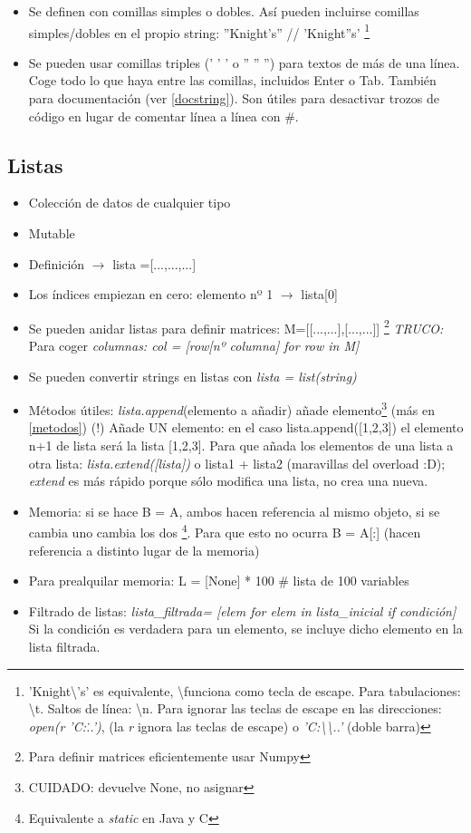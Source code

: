 		\begin{itemize}
		\item 	Se definen con comillas simples o dobles. Así pueden incluirse comillas simples/dobles en el propio string: ''Knight's'' // 'Knight''s' \footnote{'Knight\textbackslash's' es equivalente, \textbackslash funciona como tecla de escape. Para tabulaciones: \textbackslash t. Saltos de línea: \textbackslash n. Para ignorar las teclas de escape en las direcciones: \textit{open(r 'C:\...')}, (la \textit{r} ignora las teclas de escape) o \textit{'C:\textbackslash \textbackslash..'} (doble barra)}
		
		\item Se pueden usar comillas triples (' ' ' o '' '' '') para textos de más de una línea. Coge todo lo que haya entre las comillas, incluidos Enter o Tab. También para documentación (ver \ref{docstring}). Son útiles para desactivar trozos de código en lugar de comentar línea a línea con \#. 
		\end{itemize}

	\subsection {Listas}

	\begin{itemize}
	\item Colección de datos de cualquier tipo
	\item Mutable
	\item Definición $ \rightarrow $ lista =[...,...,...]
	\item Los índices empiezan en cero: elemento nº 1 $\rightarrow$ lista[0]
	\item Se pueden anidar listas para definir matrices: M=[[...,...],[...,...]] \footnote{Para definir matrices eficientemente usar Numpy} \textit{TRUCO:} Para coger \textit{columnas: col = [row[nº columna] for row in M]}
	\item Se pueden convertir strings en listas con \textit{lista = list(string)}
	\item Métodos útiles: \textit{lista.append}(elemento a añadir) añade elemento\footnote{CUIDADO: devuelve None, no asignar}
	(más en \ref{metodos}) (!) Añade UN elemento: en el caso lista.append([1,2,3]) el elemento n+1 de lista será la lista [1,2,3]. Para que añada los elementos de una lista a otra lista: \textit{lista.extend([lista])} o lista1 + lista2 (maravillas del overload :D); \textit{extend} es más rápido porque sólo modifica una lista, no crea una nueva.  
	\item Memoria: si se hace B = A, ambos hacen referencia al mismo objeto, si se cambia uno cambia los dos \footnote{Equivalente a \textit{static} en Java y C}. Para que esto no ocurra B = A[:] (hacen referencia a distinto lugar de la memoria) 
	\item Para prealquilar memoria: L = [None] * 100 \# lista de 100 variables
	\item Filtrado de listas: \textit{lista\_filtrada= [elem for elem in lista\_inicial if condición]} Si la condición es verdadera para un elemento, se incluye dicho elemento en la lista filtrada.
	\end{itemize}	

